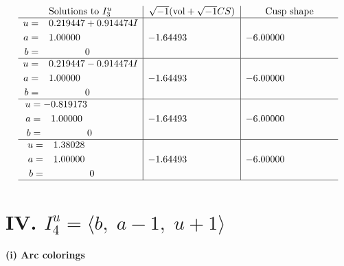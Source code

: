 \documentclass[1p]{elsarticle_modified}
\theoremstyle{definition}
\newcommand{\I}{\sqrt{-1}}
\begin{document}
$$\begin{array}{c|c|c}  
\text{Solutions to }I^u_{3}& \I (\text{vol} + \sqrt{-1}CS) & \text{Cusp shape}\\
 \hline 
\begin{aligned}
u &= \phantom{-}0.219447 + 0.914474 I \\
a &= \phantom{-}1.00000\phantom{ +0.000000I} \\
b &= \phantom{-0.000000 } 0\end{aligned}
 & -1.64493\phantom{ +0.000000I} & -6.00000\phantom{ +0.000000I} \\ \hline\begin{aligned}
u &= \phantom{-}0.219447 - 0.914474 I \\
a &= \phantom{-}1.00000\phantom{ +0.000000I} \\
b &= \phantom{-0.000000 } 0\end{aligned}
 & -1.64493\phantom{ +0.000000I} & -6.00000\phantom{ +0.000000I} \\ \hline\begin{aligned}
u &= -0.819173\phantom{ +0.000000I} \\
a &= \phantom{-}1.00000\phantom{ +0.000000I} \\
b &= \phantom{-0.000000 } 0\end{aligned}
 & -1.64493\phantom{ +0.000000I} & -6.00000\phantom{ +0.000000I} \\ \hline\begin{aligned}
u &= \phantom{-}1.38028\phantom{ +0.000000I} \\
a &= \phantom{-}1.00000\phantom{ +0.000000I} \\
b &= \phantom{-0.000000 } 0\end{aligned}
 & -1.64493\phantom{ +0.000000I} & -6.00000\phantom{ +0.000000I}\\
 \hline 
 \end{array}$$\newpage\newpage\renewcommand{\arraystretch}{1}
\centering \section*{IV. $I^u_{4}= \langle b,\;a-1,\;u+1 \rangle$}
\flushleft \textbf{(i) Arc colorings}\\
\end{document}
